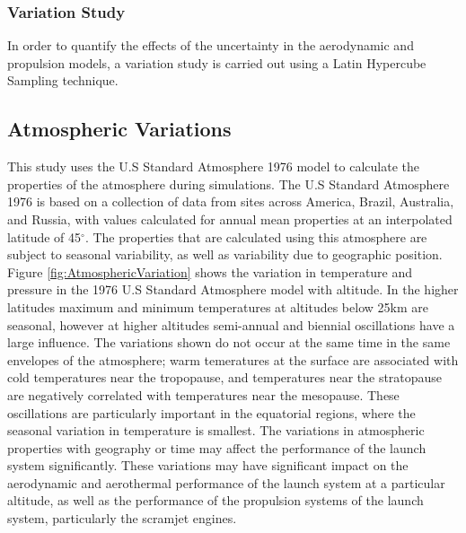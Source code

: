 \subsubsection{Variation Study}
In order to quantify the effects of the uncertainty in the aerodynamic and propulsion models, a variation study is carried out using a Latin Hypercube Sampling technique. 

\subsection{Atmospheric Variations}

This study uses the U.S Standard Atmosphere 1976 model\cite{Administration1976} to calculate the properties of the atmosphere during simulations. The U.S Standard Atmosphere 1976 is based on a collection of data from sites across America, Brazil, Australia, and Russia, with values calculated for annual mean properties at an interpolated latitude of 45$^\circ$\cite{Administration1976}. The properties that are calculated using this atmosphere are subject to seasonal variability, as well as variability due to geographic position. Figure \ref{fig:AtmosphericVariation} shows the variation in temperature and pressure in the 1976 U.S Standard Atmosphere model with altitude. In the higher latitudes maximum and minimum temperatures at altitudes below 25km are seasonal, however at higher altitudes semi-annual and biennial oscillations have a large influence\cite{Administration1976}. The variations shown do not occur at the same time in the same envelopes of the atmosphere; warm temeratures at the surface are associated with cold temperatures near the tropopause, and temperatures near the stratopause are negatively correlated with temperatures near the mesopause\cite{Administration1976}. These oscillations are particularly important in the equatorial regions, where the seasonal variation in temperature is smallest. The variations in atmospheric properties with geography or time may affect the performance of the launch system significantly. These variations may have significant impact on the aerodynamic and aerothermal performance of the launch system at a particular altitude, as well as the performance of the propulsion systems of the launch system, particularly the scramjet engines. 

